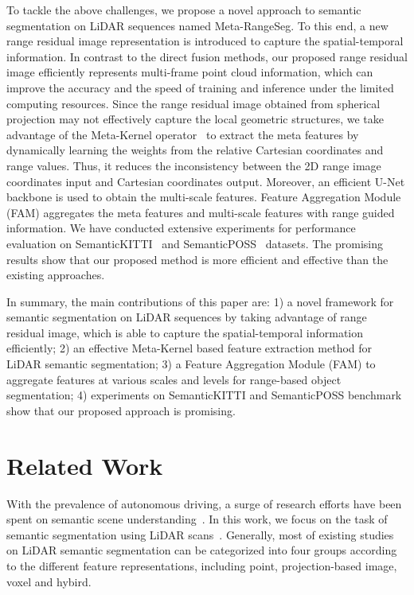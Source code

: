 \documentclass[letterpaper, 10 pt, journal, twoside]{ieeetran}
\begin{document}
To tackle the above challenges, we propose a novel approach to semantic segmentation on LiDAR sequences named Meta-RangeSeg. To this end, a new range residual image representation is introduced to capture the spatial-temporal information.
In contrast to the direct fusion methods, our proposed range residual image efficiently represents multi-frame point cloud information, which can improve the accuracy and the speed of training and inference under the limited computing resources. Since the range residual image obtained from spherical projection may not effectively capture the local geometric structures, we take advantage of the Meta-Kernel operator~\cite{fan2021rangedet} to extract the meta features by dynamically learning the weights from the relative Cartesian coordinates and range values. 
Thus, it reduces the inconsistency between the 2D range image coordinates input and Cartesian coordinates output. Moreover, an efficient U-Net backbone \cite{ronneberger2015u} is used to obtain the multi-scale features. Feature Aggregation Module (FAM) aggregates the meta features and multi-scale features with range guided information. We have conducted extensive experiments for performance evaluation on SemanticKITTI~\cite{behley2019semantickitti} and SemanticPOSS~\cite{pan2020semanticposs} datasets. The promising results show that our proposed method is more efficient and effective than the existing approaches. 

In summary, the main contributions of this paper are: 1) a novel framework for semantic segmentation on LiDAR sequences by taking advantage of range residual image, which is able to capture the spatial-temporal information efficiently; 2) an effective Meta-Kernel based feature extraction method for LiDAR semantic segmentation; 3) a Feature Aggregation Module (FAM) to aggregate features at various scales and levels for range-based object segmentation; 4) experiments on SemanticKITTI and SemanticPOSS benchmark show that our proposed approach is promising. 


\section{Related Work}\label{sec:related}
With the prevalence of autonomous driving, a surge of research efforts have been spent on semantic scene understanding~\cite{behley2019semantickitti,pan2020semanticposs,hu2022sensaturban}. In this work, we focus on the task of semantic segmentation using LiDAR scans~\cite{behley2019semantickitti,pan2020semanticposs}. Generally, most of existing studies on LiDAR semantic segmentation can be categorized into four groups according to the different feature representations, including point, projection-based image, voxel and hybird. 
\end{document}

